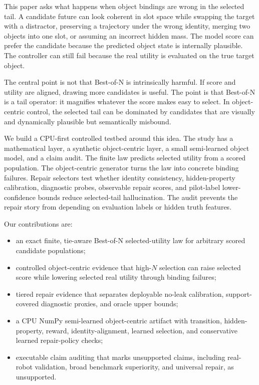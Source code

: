 \documentclass[10pt]{article}
\begin{document}
This paper asks what happens when object bindings are wrong in the selected tail. A candidate future can look coherent in slot space while swapping the target with a distractor, preserving a trajectory under the wrong identity, merging two objects into one slot, or assuming an incorrect hidden mass. The model score can prefer the candidate because the predicted object state is internally plausible. The controller can still fail because the real utility is evaluated on the true target object.

The central point is not that Best-of-N is intrinsically harmful. If score and utility are aligned, drawing more candidates is useful. The point is that Best-of-N is a tail operator: it magnifies whatever the score makes easy to select. In object-centric control, the selected tail can be dominated by candidates that are visually and dynamically plausible but semantically misbound.

We build a CPU-first controlled testbed around this idea. The study has a mathematical layer, a synthetic object-centric layer, a small semi-learned object model, and a claim audit. The finite law predicts selected utility from a scored population. The object-centric generator turns the law into concrete binding failures. Repair selectors test whether identity consistency, hidden-property calibration, diagnostic probes, observable repair scores, and pilot-label lower-confidence bounds reduce selected-tail hallucination. The audit prevents the repair story from depending on evaluation labels or hidden truth features.

Our contributions are:
\begin{itemize}
  \item an exact finite, tie-aware Best-of-N selected-utility law for arbitrary scored candidate populations;
  \item controlled object-centric evidence that high-$N$ selection can raise selected score while lowering selected real utility through binding failures;
  \item tiered repair evidence that separates deployable no-leak calibration, support-covered diagnostic proxies, and oracle upper bounds;
  \item a CPU NumPy semi-learned object-centric artifact with transition, hidden-property, reward, identity-alignment, learned selection, and conservative learned repair-policy checks;
  \item executable claim auditing that marks unsupported claims, including real-robot validation, broad benchmark superiority, and universal repair, as unsupported.
\end{itemize}
\end{document}

